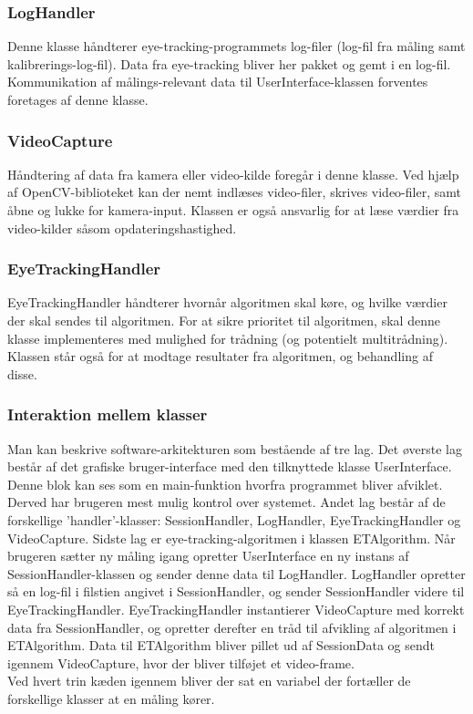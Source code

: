 \documentclass[rapport.tex]{subfiles}
\begin{document}
		\subsubsection{LogHandler}
		Denne klasse håndterer eye-tracking-programmets log-filer (log-fil fra måling samt kalibrerings-log-fil). Data fra eye-tracking bliver her pakket og gemt i en log-fil. Kommunikation af målings-relevant data til UserInterface-klassen forventes foretages af denne klasse.
		\subsubsection{VideoCapture}
		Håndtering af data fra kamera eller video-kilde foregår i denne klasse. Ved hjælp af OpenCV-biblioteket kan der nemt indlæses video-filer, skrives video-filer, samt åbne og lukke for kamera-input. Klassen er også ansvarlig for at læse værdier fra video-kilder såsom opdateringshastighed. 
		\subsubsection{EyeTrackingHandler}
		EyeTrackingHandler håndterer hvornår algoritmen skal køre, og hvilke værdier der skal sendes til algoritmen. For at sikre prioritet til algoritmen, skal denne klasse implementeres med mulighed for trådning (og potentielt multitrådning). Klassen står også for at modtage resultater fra algoritmen, og behandling af disse. 
		
		\subsubsection{Interaktion mellem klasser}
		Man kan beskrive software-arkitekturen som bestående af tre lag. Det øverste lag består af det grafiske bruger-interface med den tilknyttede klasse UserInterface. Denne blok kan ses som en main-funktion hvorfra programmet bliver afviklet. Derved har brugeren mest mulig kontrol over systemet. Andet lag består af de forskellige 'handler'-klasser: SessionHandler, LogHandler, EyeTrackingHandler og VideoCapture. Sidste lag er eye-tracking-algoritmen i klassen ETAlgorithm. Når brugeren sætter ny måling igang opretter UserInterface en ny instans af SessionHandler-klassen og sender denne data til LogHandler. LogHandler opretter så en log-fil i filstien angivet i SessionHandler, og sender SessionHandler videre til EyeTrackingHandler. EyeTrackingHandler instantierer VideoCapture med korrekt data fra SessionHandler, og opretter derefter en tråd til afvikling af algoritmen i ETAlgorithm. Data til ETAlgorithm bliver pillet ud af SessionData og sendt igennem VideoCapture, hvor der bliver tilføjet et video-frame. \\
		Ved hvert trin kæden igennem bliver der sat en variabel der fortæller de forskellige klasser at en måling kører. 
		
\end{document}
